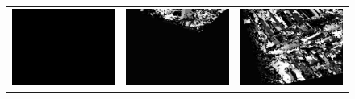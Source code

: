 \documentclass[11pt]{report}
\begin{document}
\begin{figure}[H]
\begin{tabular}{ccc}
    \includegraphics[scale=0.1]{images/disparity-opencv-t/disparity_14.png} &
    \includegraphics[scale=0.1]{images/disparity-opencv-d/disparity_14.png} &
    \includegraphics[scale=0.1]{images/disparity-opengv/disparity_14.png} \\

\end{tabular}
\end{figure}
\end{document}
